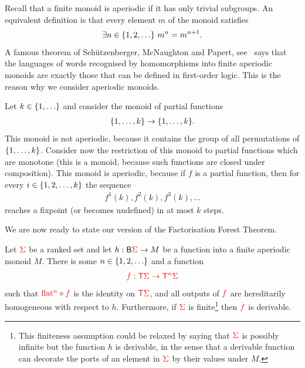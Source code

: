 Recall that a finite monoid is aperiodic if it has only trivial subgroups. An equivalent definition is that every element $m$ of the monoid satisfies 
\begin{align*}
  \exists n \in \{1,2,\ldots\}\   m^n = m^{n+1}.
\end{align*} 
A famous theorem of Sch\"utzenberger, McNaughton and Papert, see~\cite[Theorem VI.1.1]{straubingFiniteAutomataFormal1994} says that the languages  of words recognised by homomorphisms into finite aperiodic monoids are exactly  those that can be defined in first-order logic. This is the reason why  we consider aperiodic monoids.

\begin{example}\label{ex:partial-monoton-functions}
   Let $k \in \{1,\ldots\}$ and  consider the monoid of partial functions 
    \begin{align*}
    \{1,\ldots,k\} \to \{1,\ldots,k\}.
    \end{align*}
    This monoid is not aperiodic, because it contains the  group of all permutations of $\{1,\ldots,k\}$. Consider now the restriction of this monoid to partial functions which are monotone (this is a monoid, because such functions are closed under composition). This monoid is aperiodic, because if $f$ is a partial function, then for  every $i \in \{1,2,\ldots,k\}$ the sequence
    \begin{align*}
    f^1(k),f^2(k),f^3(k),\ldots
    \end{align*}
    reaches a fixpoint (or becomes undefined) in at most $k$ steps.
\end{example}
We are now ready to state our version of the Factorisation Forest Theorem. 
\begin{theorem}\label{thm:factfor}
    Let ${\color{red}{\Sigma}}$ be a  ranked set and let $h : \mathsf{B}  {\color{red}{\Sigma}} \to M$ be a function into a finite aperiodic monoid $M$. There is some $n \in \{1,2,\ldots\}$ and a  function
    \begin{align*}
        {\color{red}{f : {\color{red}{\mathsf T}}{\color{red}{\Sigma}}\to {\color{red}{\mathsf T}}^n {\color{red}{\Sigma}}}}  
    \end{align*}
such that ${\color{red}{\mathrm{flat}}}^{{\color{red}{n}}} \circ {\color{red}{f}}$ is the identity on ${\color{red}{\mathsf T}} {\color{red}{\Sigma}}$, and  all outputs of  ${\color{red}{f}}$ are hereditarily homogeneous with respect to $h$. Furthermore, if ${\color{red}{\Sigma}}$ is finite\footnote{This finiteness assumption could be relaxed by saying that ${\color{red}{\Sigma}}$ is possibly infinite but the function $h$ is derivable, in the sense that a derivable function can decorate the ports of an element in ${\color{red}{\Sigma}}$ by their values under $M$.} then ${\color{red}{f}}$ is derivable. 
\end{theorem}



